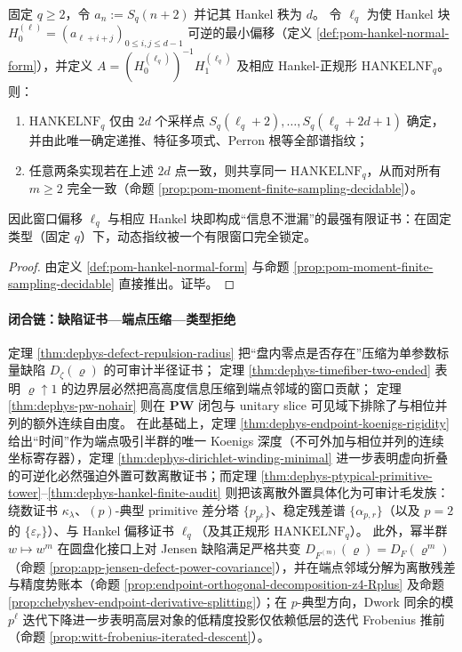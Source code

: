 \begin{theorem}\label{thm:dephys-hankel-finite-audit}
固定 \(q\ge 2\)，令 \(a_n:=S_q(n+2)\) 并记其 Hankel 秩为 \(d\)。
令 \(\ell_q\) 为使 Hankel 块 \(H_0^{(\ell)}=(a_{\ell+i+j})_{0\le i,j\le d-1}\) 可逆的最小偏移（定义 \ref{def:pom-hankel-normal-form}），并定义
\(
A=(H_0^{(\ell_q)})^{-1}H_1^{(\ell_q)}
\)
及相应 Hankel-正规形 \(\mathrm{HANKELNF}_q\)。
则：
\begin{enumerate}
  \item \(\mathrm{HANKELNF}_q\) 仅由 \(2d\) 个采样点 \(S_q(\ell_q+2),\dots,S_q(\ell_q+2d+1)\) 确定，并由此唯一确定递推、特征多项式、Perron 根等全部谱指纹；
  \item 任意两条实现若在上述 \(2d\) 点一致，则共享同一 \(\mathrm{HANKELNF}_q\)，从而对所有 \(m\ge 2\) 完全一致（命题 \ref{prop:pom-moment-finite-sampling-decidable}）。
\end{enumerate}
因此窗口偏移 \(\ell_q\) 与相应 Hankel 块即构成“信息不泄漏”的最强有限证书：在固定类型（固定 \(q\)）下，动态指纹被一个有限窗口完全锁定。
\end{theorem}

\begin{proof}
由定义 \ref{def:pom-hankel-normal-form} 与命题 \ref{prop:pom-moment-finite-sampling-decidable} 直接推出。证毕。
\end{proof}



\paragraph{闭合链：缺陷证书—端点压缩—类型拒绝}
定理 \ref{thm:dephys-defect-repulsion-radius} 把“盘内零点是否存在”压缩为单参数标量缺陷 \(D_{\zeta}(\varrho)\) 的可审计半径证书；
定理 \ref{thm:dephys-timefiber-two-ended} 表明 \(\varrho\uparrow 1\) 的边界层必然把高高度信息压缩到端点邻域的窗口贡献；
定理 \ref{thm:dephys-pw-nohair} 则在 \(\mathbf{PW}\) 闭包与 unitary slice 可见域下排除了与相位并列的额外连续自由度。
在此基础上，定理 \ref{thm:dephys-endpoint-koenigs-rigidity} 给出“时间”作为端点吸引半群的唯一 Koenigs 深度（不可外加与相位并列的连续坐标寄存器），定理 \ref{thm:dephys-dirichlet-winding-minimal} 进一步表明虚向折叠的可逆化必然强迫外置可数离散证书；而定理 \ref{thm:dephys-ptypical-primitive-tower}--\ref{thm:dephys-hankel-finite-audit} 则把该离散外置具体化为可审计毛发族：绕数证书 \(\kappa_{\lambda}\)、\((p)\)-典型 primitive 差分塔 \(\{p_{p^k}\}\)、稳定残差谱 \(\{\alpha_{p,r}\}\)（以及 \(p=2\) 的 \(\{\varepsilon_r\}\)）、与 Hankel 偏移证书 \(\ell_q\)（及其正规形 \(\mathrm{HANKELNF}_q\)）。
此外，幂半群 \(w\mapsto w^m\) 在圆盘化接口上对 Jensen 缺陷满足严格共变 \(D_{F^{(m)}}(\varrho)=D_F(\varrho^m)\)（命题 \ref{prop:app-jensen-defect-power-covariance}），并在端点邻域分解为离散残差与精度势账本（命题 \ref{prop:endpoint-orthogonal-decomposition-z4-Rplus} 及命题 \ref{prop:chebyshev-endpoint-derivative-splitting}）；在 \(p\)-典型方向，Dwork 同余的模 \(p^\ell\) 迭代下降进一步表明高层对象的低精度投影仅依赖低层的迭代 Frobenius 推前（命题 \ref{prop:witt-frobenius-iterated-descent}）。

